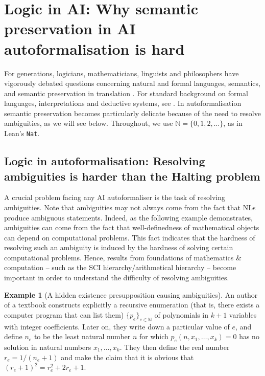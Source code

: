 \documentclass[10pt, a4paper, reqno]{amsart}
\numberwithin{equation}{section}
\theoremstyle{definition}
\newtheorem{example}[theorem]{Example}
\theoremstyle{definition}
\begin{document}
\section{Logic in AI: Why semantic preservation in AI autoformalisation is hard} \label{sec:SemanticPreservationHard}
For generations, logicians, mathematicians, linguists and philosophers have vigorously debated questions concerning natural and formal languages, semantics, and semantic preservation in translation  \cite{Moschovakis2006, Hales2019CNL, IcardMoss2023, BertoHornischer2023, vanBenthem2014, Montague1970UniversalGrammar, Montague1974English, Quine1959MeaningTranslation, Quine1970Indeterminacy, Tarski1944Truth, Rabe2017Logics, Benthem2}. For standard background on formal languages, interpretations and deductive systems, see \cite[Chapters~1--2]{Enderton2001}. In autoformalisation semantic preservation becomes particularly delicate because of the need to resolve ambiguities, as we will see below. Throughout, we use $\mathbb{N}=\{0,1,2,\ldots\}$, as in Lean's \texttt{Nat}.

\subsection{Logic in autoformalisation: Resolving ambiguities is harder than the Halting problem}\label{sec:Halting} A crucial problem facing any AI autoformaliser is the task of resolving ambiguities. Note that ambiguities may not always come from the fact that NLs produce ambiguous statements. Indeed, as the following example demonstrates, ambiguities can come from the fact that well-definedness of mathematical objects can depend on computational problems. This fact indicates that the hardness of resolving such an ambiguity is induced by the hardness of solving certain computational problems.  Hence, results from foundations of mathematics \& computation -- such as the SCI hierarchy/arithmetical hierarchy -- become important in order to understand the difficulty of resolving ambiguities. 
 
\begin{example}[A hidden existence presupposition causing ambiguities]\label{ex:example3}
	An author of a textbook constructs explicitly a recursive enumeration (that is, there exists a computer program that can list them) $\{p_e\}_{e \in \mathbb{N}}$ of polynomials in $k+1$ variables with integer coefficients. Later on, they write down a particular value of $e$, and define $n_e$ to be the least natural number $n$ for which
	$p_e(n,x_1,\ldots,x_k)=0$ has no solution in natural numbers $x_1,\ldots,x_k$. They then define the real number $r_e=1/(n_e+1)$ and make the claim that it is obvious that $(r_e+1)^2 = r_e^2+2r_e+1$.
\end{example}
\end{document}
